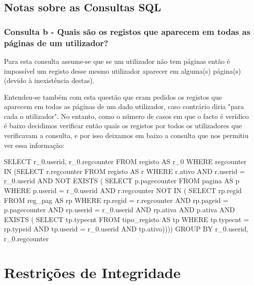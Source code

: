 \documentclass[11pt,a4paper]{article}
\begin{document}
\subsection{Notas sobre as Consultas SQL}
\subsubsection{Consulta b -  Quais são os registos que aparecem em todas as páginas de um utilizador?}
Para esta consulta assume-se que se um utilizador não tem páginas então é impossível um registo desse mesmo utilizador aparecer em alguma(s) página(s) (devido à inexistência destas).

Entendeu-se também com esta questão que eram pedidos os registos que aparecem em todas as páginas de um dado utilizador, caso contrário diria "para cada o utilizador". No entanto, como o número de casos em que o facto é verídico é baixo decidimos verificar então quais os registos por todos os utilizadores que verificavam a consulta, e por isso deixamos em baixo a consulta que nos permitiu ver essa informação:

\begin{code}[language=SQL]
SELECT r_0.userid,
       r_0.regcounter
FROM registo AS r_0
WHERE regcounter IN
        (SELECT r.regcounter
         FROM registo AS r
         WHERE r.ativo
             AND r.userid = r_0.userid
             AND NOT EXISTS
                 ( SELECT p.pagecounter
                  FROM pagina AS p
                  WHERE p.userid = r_0.userid
                      AND r.regcounter NOT IN
                          ( SELECT rp.regid
                           FROM reg_pag AS rp
                           WHERE rp.regid = r.regcounter
                               AND rp.pageid = p.pagecounter
                               AND rp.userid = r_0.userid
                               AND rp.ativa
                               AND p.ativa
                               AND EXISTS
                                   ( SELECT tp.typecnt
                                    FROM tipo_registo AS tp
                                    WHERE tp.typecnt = rp.typeid
                                        AND tp.userid = r_0.userid
                                        AND tp.ativo))))
GROUP BY r_0.userid,
         r_0.regcounter
\end{code}

\newpage

\section{Restrições de Integridade}
\newpage
\end{document}
